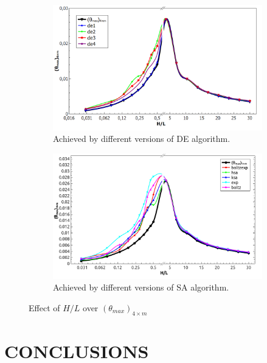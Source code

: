 \documentclass[10pt,fleqn,a4paper,twoside]{article}
\begin{document}
\begin{figure}[h]
\centering
	\begin{subfigure}{0.52\textwidth}
		\centering
		\includegraphics[width=1\linewidth]{imgs/de_300_iter/g_hl_tmim_1.png}
		\caption{ {\small Achieved by different versions of DE algorithm.}}
		\label{figure03:sub1}
	\end{subfigure}%
	\begin{subfigure}{0.52\textwidth}
		\centering
		\includegraphics[width=1\linewidth]{imgs/sa_c_300_iter/g_hl_tmim_1.png}
		\caption{ {\small Achieved by different versions of SA algorithm.}}
		\label{figure03:sub2}
	\end{subfigure}%
\caption{Effect of $H/L$ over $({\theta}_{max})_{4\times m}$}
\label{figure03}
\end{figure}

\section{CONCLUSIONS}
\end{document}
